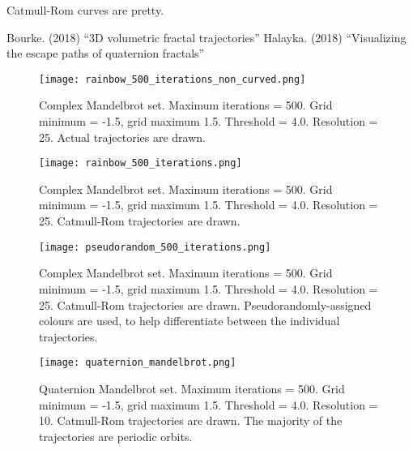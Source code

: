 \documentclass[12pt]{article}
\begin{document}
Catmull-Rom curves are pretty.












\begin{thebibliography}{9}
 Bourke. (2018) ``3D volumetric fractal trajectories''
 Halayka. (2018) ``Visualizing the escape paths of quaternion fractals''
\end{thebibliography}



\pagebreak




\begin{figure} 
\centering
  \texttt{[image: rainbow\_500\_iterations\_non\_curved.png]}	
  \caption{Complex Mandelbrot set.
Maximum iterations = 500.
Grid minimum = -1.5, grid maximum 1.5.
Threshold = 4.0.
Resolution = 25.
Actual trajectories are drawn.}
\end{figure}

\begin{figure} 
\centering
  \texttt{[image: rainbow\_500\_iterations.png]}	
  \caption{
Complex Mandelbrot set.
Maximum iterations = 500.
Grid minimum = -1.5, grid maximum 1.5.
Threshold = 4.0. 
Resolution = 25.
Catmull-Rom trajectories are drawn.}
\end{figure}

\begin{figure} 
\centering
  \texttt{[image: pseudorandom\_500\_iterations.png]}	
  \caption{
Complex Mandelbrot set.
Maximum iterations = 500.
Grid minimum = -1.5, grid maximum 1.5.
Threshold = 4.0.
Resolution = 25.
Catmull-Rom trajectories are drawn.
Pseudorandomly-assigned colours are used, to help differentiate between the individual trajectories.}
\end{figure}


\begin{figure} 
\centering
  \texttt{[image: quaternion\_mandelbrot.png]}	
  \caption{
Quaternion Mandelbrot set.
Maximum iterations = 500.
Grid minimum = -1.5, grid maximum 1.5.
Threshold = 4.0.
Resolution = 10.
Catmull-Rom trajectories are drawn.
The majority of the trajectories are periodic orbits.}
\end{figure}
\end{document}
